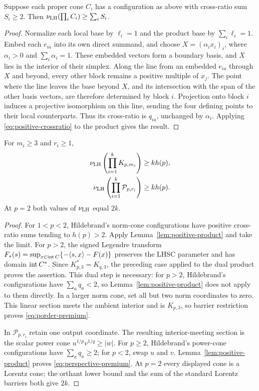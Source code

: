 \begin{lemma}
\label{lem:positive-product}
Suppose each proper cone $C_i$ has a configuration as above with
cross-ratio sum $S_i\geq2$. Then
$\nu_{\rm LH}(\prod_i C_i)\geq\sum_i S_i$.
\end{lemma}
\begin{proof}
Normalize each local base by $\ell_i=1$ and the product base by
$\sum_i\ell_i=1$. Embed each $e_{ia}$ into its own direct summand, and
choose $X=(\alpha_i x_i)_i$, where $\alpha_i>0$ and $\sum_i\alpha_i=1$.
These embedded vectors form a boundary basis, and $X$ lies in the
interior of their simplex. Along the line from an embedded $e_{ia}$ through $X$
and beyond, every other block remains a positive multiple of $x_j$.
The point where the line leaves the base beyond $X$, and its
intersection with the span of the other basis vectors, are therefore
determined by block $i$.
Projection onto block $i$ induces a projective isomorphism on this line,
sending the four defining points to their local counterparts. Thus its
cross-ratio is $q_{ia}$, unchanged by $\alpha_i$. Applying
\eqref{eq:positive-crossratio} to the product gives the result.
\end{proof}

\begin{theorem}
\label{thm:nonsymmetric-premium}
For $m_i\geq3$ and $r_i\geq1$,
\begin{align}
 \nu_{\rm LH}\left(\prod_{i=1}^k K_{p,m_i}\right)&\geq k h(p),
 \label{eq:porder-premium}\\
 \nu_{\rm LH}\left(\prod_{i=1}^k\mathcal P_{p,r_i}\right)&\geq k h(p).
 \label{eq:perspective-premium}
\end{align}
At $p=2$ both values of $\nu_{\rm LH}$ equal $2k$.
\end{theorem}
\begin{proof}
For $1<p<2$, Hildebrand's norm-cone configurations have positive
cross-ratio sums tending to $h(p)>2$. Apply
Lemma~\ref{lem:positive-product} and take the limit. For $p>2$, the
signed Legendre transform
$F_*(s)=\sup_{x\in\operatorname{int} C}\{-\langle s,x\rangle-F(x)\}$ preserves the LHSC
parameter and has domain $\operatorname{int} C^*$. Since
$K_{p,3}^*=K_{q,3}$, the preceding case applied to the dual product
proves the assertion. This dual step is necessary: for $p>2$,
Hildebrand's configurations have $\sum_aq_a<2$, so
Lemma~\ref{lem:positive-product} does not apply to them directly.
In a larger norm cone, set all but two norm coordinates to zero. This
linear section meets the ambient interior and is $K_{p,3}$, so barrier
restriction proves \eqref{eq:porder-premium}.

In $\mathcal P_{p,r_i}$ retain one output coordinate. The resulting
interior-meeting section is the scalar power cone
$u^{1/p}v^{1/q}\geq|w|$. For $p\geq2$, Hildebrand's power-cone
configurations have $\sum_aq_a\geq2$; for $p<2$, swap $u$ and $v$. Lemma~\ref{lem:positive-product} proves
\eqref{eq:perspective-premium}. At $p=2$ every displayed cone is a
Lorentz cone; the orthant lower bound and the sum of the standard
Lorentz barriers both give $2k$.
\end{proof}

